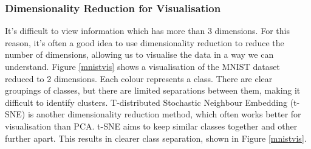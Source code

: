 \documentclass[11pt]{article}
\begin{document}
\subsubsection{Dimensionality Reduction for Visualisation}

It's difficult to view information which has more than 3 dimensions. For this reason, it's often a good idea to use dimensionality reduction to reduce the number of dimensions, allowing us to visualise the data in a way we can understand. Figure \ref{mnistvis} shows a visualisation of the MNIST dataset reduced to 2 dimensions. Each colour represents a class. There are clear groupings of classes, but there are limited separations between them, making it difficult to identify clusters. T-distributed Stochastic Neighbour Embedding (t-SNE) is another dimensionality reduction method, which often works better for visualisation than PCA. t-SNE aims to keep similar classes together and other further apart. This results in  clearer class separation, shown in Figure \ref{mnistvis}.
\end{document}
